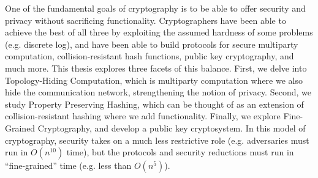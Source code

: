 % 
% 
%
One of the fundamental goals of cryptography is to be able to offer security and privacy without sacrificing functionality. Cryptographers have been able to achieve the best of all three by exploiting the assumed hardness of some problems (e.g. discrete log), and have been able to build protocols for secure multiparty computation, collision-resistant hash functions, public key cryptography, and much more.
This thesis explores three facets of this balance.
First, we delve into Topology-Hiding Computation, which is multiparty computation where we also hide the communication network, strengthening the notion of privacy.
Second, we study Property Preserving Hashing, which can be thought of as an extension of collision-resistant hashing where we add functionality.
Finally, we explore Fine-Grained Cryptography, and develop a public key cryptosystem. In this model of cryptography, security takes on a much less restrictive role (e.g. adversaries must run in $O(n^{10})$ time), but the protocols and security reductions must run in ``fine-grained'' time (e.g. less than $O(n^5)$).

